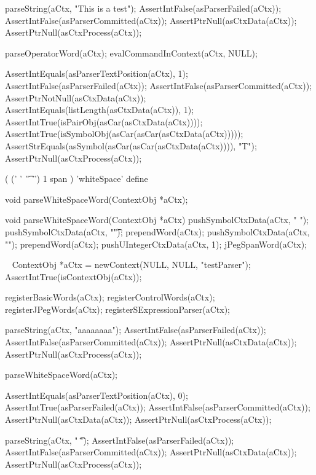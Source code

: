 \startCTest
  parseString(aCtx, "This is a test");
  AssertIntFalse(asParserFailed(aCtx));
  AssertIntFalse(asParserCommitted(aCtx));
  AssertPtrNull(asCtxData(aCtx));
  AssertPtrNull(asCtxProcess(aCtx));
  
  parseOperatorWord(aCtx);
  evalCommandInContext(aCtx, NULL);
  
  AssertIntEquals(asParserTextPosition(aCtx), 1);
  AssertIntFalse(asParserFailed(aCtx));
  AssertIntFalse(asParserCommitted(aCtx));
  AssertPtrNotNull(asCtxData(aCtx));
  AssertIntEquals(listLength(asCtxData(aCtx)), 1);
  AssertIntTrue(isPairObj(asCar(asCtxData(aCtx))));
  AssertIntTrue(isSymbolObj(asCar(asCar(asCtxData(aCtx)))));
  AssertStrEquals(asSymbol(asCar(asCar(asCtxData(aCtx)))), "T");
  AssertPtrNull(asCtxProcess(aCtx));
\stopCTest
\stopTestCase
\stopTestSuite

\startTestSuite[parseWhiteSpaceWord]

\starttyping
(
  (' ' '\t' '\n') 1 span
) 'whiteSpace' define
\stoptyping

\startCHeader
void parseWhiteSpaceWord(ContextObj *aCtx);
\stopCHeader

\startCCode
void parseWhiteSpaceWord(ContextObj *aCtx) {
  pushSymbolCtxData(aCtx, " ");
  pushSymbolCtxData(aCtx, "\t");
  prependWord(aCtx);
  pushSymbolCtxData(aCtx, "\n");
  prependWord(aCtx);
  pushUIntegerCtxData(aCtx, 1);
  jPegSpanWord(aCtx);
}
\stopCCode

\CTestsSuiteSetup\
\startCTest
  ContextObj *aCtx = newContext(NULL, NULL, "testParser");
  AssertIntTrue(isContextObj(aCtx));
  
  registerBasicWords(aCtx);
  registerControlWords(aCtx);
  registerJPegWords(aCtx);
  registerSExpressionParser(aCtx);
\stopCTest

\startCTest
  parseString(aCtx, "aaaaaaaa");
  AssertIntFalse(asParserFailed(aCtx));
  AssertIntFalse(asParserCommitted(aCtx));
  AssertPtrNull(asCtxData(aCtx));
  AssertPtrNull(asCtxProcess(aCtx));
  
  parseWhiteSpaceWord(aCtx);
  
  AssertIntEquals(asParserTextPosition(aCtx), 0);
  AssertIntTrue(asParserFailed(aCtx));
  AssertIntFalse(asParserCommitted(aCtx));
  AssertPtrNull(asCtxData(aCtx));
  AssertPtrNull(asCtxProcess(aCtx));
\stopCTest
\stopTestCase

\startCTest
  parseString(aCtx, " \t\naaa");
  AssertIntFalse(asParserFailed(aCtx));
  AssertIntFalse(asParserCommitted(aCtx));
  AssertPtrNull(asCtxData(aCtx));
  AssertPtrNull(asCtxProcess(aCtx));
  
